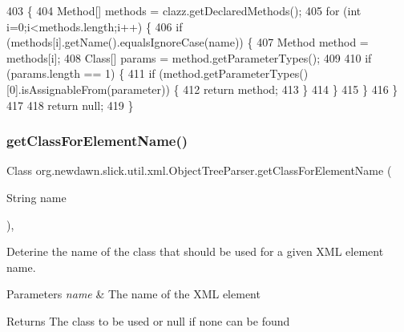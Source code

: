 \begin{DoxyCode}
403                                                                          \{
404         Method[] methods = clazz.getDeclaredMethods();
405         \textcolor{keywordflow}{for} (\textcolor{keywordtype}{int} i=0;i<methods.length;i++) \{
406             \textcolor{keywordflow}{if} (methods[i].getName().equalsIgnoreCase(name)) \{
407                 Method method = methods[i];
408                 Class[] params = method.getParameterTypes();
409                 
410                 \textcolor{keywordflow}{if} (params.length == 1) \{
411                     \textcolor{keywordflow}{if} (method.getParameterTypes()[0].isAssignableFrom(parameter)) \{
412                         \textcolor{keywordflow}{return} method;
413                     \}
414                 \}
415             \}
416         \}
417         
418         \textcolor{keywordflow}{return} null;
419     \}
\end{DoxyCode}
\mbox{\label{classorg_1_1newdawn_1_1slick_1_1util_1_1xml_1_1_object_tree_parser_a0c4c72b306807c49a12e60724c0eddb3}} 
\subsubsection{\texorpdfstring{get\+Class\+For\+Element\+Name()}{getClassForElementName()}}
{\footnotesize\ttfamily Class org.\+newdawn.\+slick.\+util.\+xml.\+Object\+Tree\+Parser.\+get\+Class\+For\+Element\+Name (\begin{DoxyParamCaption}\item[{String}]{name }\end{DoxyParamCaption})\hspace{0.3cm}{\ttfamily [inline]}, {\ttfamily [private]}}

Deterine the name of the class that should be used for a given X\+ML element name.


\begin{DoxyParams}{Parameters}
{\em name} & The name of the X\+ML element \\
\hline
\end{DoxyParams}
\begin{DoxyReturn}{Returns}
The class to be used or null if none can be found 
\end{DoxyReturn}

